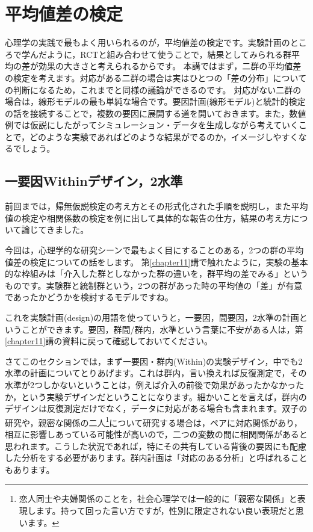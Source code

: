 \documentclass{ltjsarticle}
\begin{document}
\chapter{平均値差の検定}
\label{chapter19}
心理学の実践で最もよく用いられるのが，平均値差の検定です。実験計画のところで学んだように，RCTと組み合わせて使うことで，結果としてみられる群平均の差が効果の大きさと考えられるからです。
本講ではまず，二群の平均値差の検定を考えます。対応がある二群の場合は実はひとつの「差の分布」についての判断になるため，これまでと同様の議論ができるのです。
対応がない二群の場合は，線形モデルの最も単純な場合です。要因計画(線形モデル)と統計的検定の話を接続することで，複数の要因に展開する道を開いておきます。また，数値例では仮説にしたがってシミュレーション・データを生成しながら考えていくことで，どのような実験であればどのような結果がでるのか，イメージしやすくなるでしょう。

\section{一要因Withinデザイン，2水準}
前回までは，帰無仮説検定の考え方とその形式化された手順を説明し，また平均値の検定や相関係数の検定を例に出して具体的な報告の仕方，結果の考え方について論じてきました。

今回は，心理学的な研究シーンで最もよく目にすることのある，2つの群の平均値差の検定についての話をします。
第\ref{chapter11}講で触れたように，実験の基本的な枠組みは「介入した群としなかった群の違いを，群平均の差でみる」というものです。実験群と統制群という，2つの群があった時の平均値の「差」が有意であったかどうかを検討するモデルですね。

これを実験計画(design)の用語を使っていうと，一要因，間要因，2水準の計画ということができます。要因，群間/群内，水準という言葉に不安がある人は，第\ref{chapter11}講の資料に戻って確認しておいてください。

さてこのセクションでは，まず一要因・群内(Within)の実験デザイン，中でも2水準の計画についてとりあげます。これは群内，言い換えれば反復測定で，その水準が2つしかないということは，例えば介入の前後で効果があったかなかったか，という実験デザインだということになります。細かいことを言えば，群内のデザインは反復測定だけでなく，データに対応がある場合も含まれます。双子の研究や，親密な関係の二人\footnote{恋人同士や夫婦関係のことを，社会心理学では一般的に「親密な関係」と表現します。持って回った言い方ですが，性別に限定されない良い表現だと思います。}について研究する場合は，ペアに対応関係があり，相互に影響しあっている可能性が高いので，二つの変数の間に相関関係があると思われます。こうした状況であれば，特にその共有している背後の要因にも配慮した分析をする必要があります。群内計画は「対応のある分析」と呼ばれることもあります。
\end{document}
